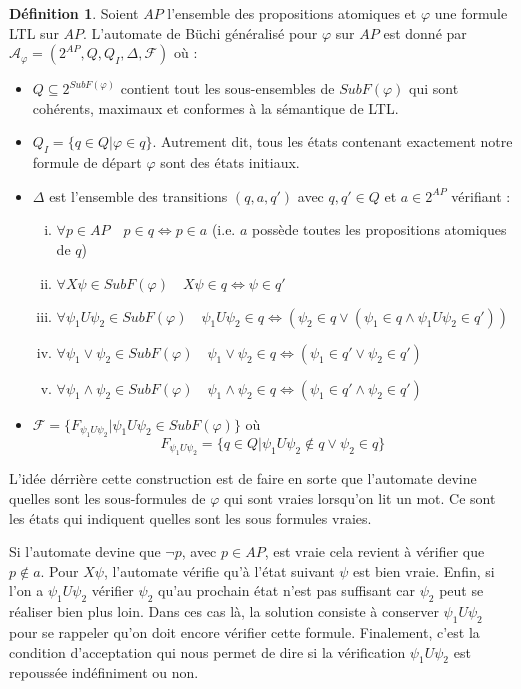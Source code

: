 \documentclass[12pt,a4paper]{article}
\theoremstyle{plain}
\theoremstyle{definition}
\newtheorem{defi}{Définition}
\begin{document}
\begin{defi}
  Soient $AP$ l'ensemble des propositions atomiques et $\varphi$ une formule LTL sur $AP$.
  L'automate de Büchi généralisé pour $\varphi$ sur $AP$ est donné par $\mathcal{A}_\varphi = (2^{AP}, Q, Q_I, \Delta, \mathscr{F})$ où :
  \begin{itemize}
  \item $Q \subseteq 2^{SubF(\varphi)}$ contient tout les sous-ensembles de $SubF(\varphi)$ qui sont cohérents, maximaux et conformes à la sémantique de LTL.
  \item $Q_I = \{ q \in Q | \varphi \in q \}$. Autrement dit, tous les états contenant exactement notre formule de départ $\varphi$ sont des états initiaux.
  \item $\Delta$ est l'ensemble des transitions $(q, a, q')$ avec $q, q' \in Q$ et $a \in 2^{AP}$ vérifiant :
    \begin{enumerate}[(i)]
    \item $\forall p \in AP \quad p \in q \iff p \in a$ (i.e. $a$ possède toutes les propositions atomiques de $q$)
    \item $\forall X\psi \in SubF(\varphi) \quad X\psi \in q \iff \psi \in q'$
    \item $\forall \psi_1 U \psi_2 \in SubF(\varphi) \quad \psi_1 U \psi_2 \in q \iff \left( \psi_2 \in q \lor (\psi_1 \in q \land \psi_1 U \psi_2 \in q')\right)$
    \item $\forall \psi_1 \lor \psi_2 \in SubF(\varphi) \quad \psi_1 \lor \psi_2 \in q \iff (\psi_1 \in q' \lor \psi_2 \in q')$
    \item $\forall \psi_1 \land \psi_2 \in SubF(\varphi) \quad \psi_1 \land \psi_2 \in q \iff (\psi_1 \in q' \land \psi_2 \in q')$
    \end{enumerate}
  \item $\mathscr{F} = \{F_{\psi_1 U \psi_2} | \psi_1 U \psi_2 \in SubF(\varphi)\}$ où
    \[
      F_{\psi_1 U \psi_2} = \{q \in Q | \psi_1 U \psi_2 \not \in q \lor \psi_2\in q \}
    \]
  \end{itemize}
\end{defi}

L'idée dérrière cette construction est de faire en sorte que l'automate devine quelles sont les sous-formules de $\varphi$ qui sont vraies lorsqu'on lit un mot.
Ce sont les états qui indiquent quelles sont les sous formules vraies.

Si l'automate devine que $\lnot p$, avec $p \in AP$, est vraie cela revient à vérifier que $p \not \in a$.
Pour $X \psi$, l'automate vérifie qu'à l'état suivant $\psi$ est bien vraie.
Enfin, si l'on a $\psi_1 U \psi_2$ vérifier $\psi_2$ qu'au prochain état n'est pas suffisant car $\psi_2$ peut se réaliser bien plus loin.
Dans ces cas là, la solution consiste à conserver $\psi_1 U \psi_2$ pour se rappeler qu'on doit encore vérifier cette formule.
Finalement, c'est la condition d'acceptation qui nous permet de dire si la vérification $\psi_1 U \psi_2$ est repoussée indéfiniment ou non.
\end{document}
